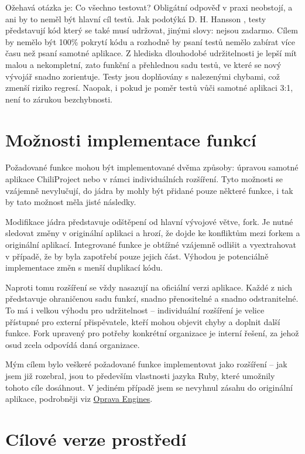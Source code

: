 \documentclass[thesis=B,czech]{FITthesis}[2012/05/02]
\begin{document}
Ožehavá otázka je: Co všechno testovat? Obligátní odpověď  v
praxi neobstojí, a ani by to neměl být hlavní cíl testů. Jak podotýká D.
H. Hansson \citep{HanssonTestingTSA}, testy představují kód který se
také musí udržovat, jinými slovy: nejsou zadarmo. Cílem by nemělo být
100\% pokrytí kódu a rozhodně by psaní testů nemělo zabírat více času
než psaní samotné aplikace. Z hlediska dlouhodobé udržitelnosti je lepší
mít malou a nekompletní, zato funkční a přehlednou sadu testů, ve které
se nový vývojář snadno zorientuje. Testy jsou doplňovány s nalezenými
chybami, což zmenší riziko regresí. Naopak, i pokud je poměr testů vůči
samotné aplikaci 3:1, není to zárukou bezchybnosti.

\section{Možnosti implementace funkcí}

Požadované funkce mohou být implementované dvěma způsoby: úpravou
samotné aplikace ChiliProject nebo v rámci individuálních rozšíření.
Tyto možnosti se vzájemně nevylučují, do jádra by mohly být přidané
pouze některé funkce, i tak by tato možnost měla jisté následky.

Modifikace jádra představuje odštěpení od hlavní vývojové větve,
\gls{fork}. Je nutné sledovat změny v originální aplikaci a hrozí, že
dojde ke konfliktům mezi forkem a originální aplikací. Integrované
funkce je obtížné vzájemně odlišit a vyextrahovat v případě, že by byla
zapotřebí pouze jejich část. Výhodou je potenciálně 
implementace změn s menší duplikací kódu.

Naproti tomu rozšíření se vždy nasazují na oficiální verzi aplikace.
Každé z nich představuje ohraničenou sadu funkcí, snadno přenositelné a
snadno odstranitelné. To má i velkou výhodu pro udržitelnost --
individuální rozšíření je velice přístupné pro externí přispěvatele,
kteří mohou objevit chyby a doplnit další funkce. Fork upravený pro
potřeby konkrétní organizace je interní řešení, za jehož osud zcela
odpovídá daná organizace.

Mým cílem bylo veškeré požadované funkce implementovat jako rozšíření --
jak jsem již rozebral, jsou to především vlastnosti jazyka Ruby, které
umožnily tohoto cíle dosáhnout. V jediném případě jsem se nevyhnul
zásahu do originální aplikace, podrobněji viz
\href{\#oprava-engines}{Oprava Engines}.

\section{Cílové verze prostředí}
\end{document}

